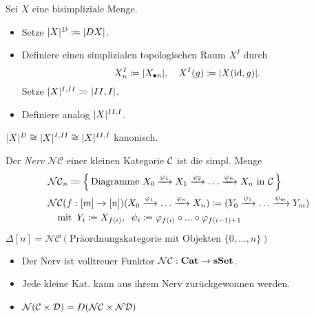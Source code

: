 \documentclass{cheat-sheet}
\newcommand{\NCat}{\mathcal{NC}} %
\newcommand{\Nerve}{\mathcal{N}} %
\begin{document}
\begin{defn}
  Sei $X$ eine bisimpliziale Menge.
  \begin{itemize}
    \item Setze $\lvert X\rvert^D \coloneqq \lvert DX\rvert$.
    \item Definiere einen simplizialen topologischen Raum $X^I$ durch
    \[ X^I_n \coloneqq \lvert X_{\bullet n}\rvert, \quad X^I(g) \coloneqq \lvert X(\operatorname{id}, g)\rvert. \]
    Setze $\lvert X\rvert^{I,II} \coloneqq \lvert II,I\rvert$.
    \item Definiere analog $\lvert X\rvert^{II,I}$.
  \end{itemize}
\end{defn}

\begin{satz}
  $\lvert X\rvert^D \cong \lvert X\rvert^{I,II} \cong \lvert X\rvert^{II,I}$ kanonisch.
\end{satz}

\begin{defn}
  Der \emph{Nerv} $\NCat$ einer kleinen Kategorie $\mathcal{C}$ ist die simpl. Menge
  \begin{align*}
    & \NCat_n \coloneqq \left\{ \, \text{Diagramme } X_0 \xrightarrow{\varphi_1} X_1 \xrightarrow{\varphi_2} \ldots \xrightarrow{\varphi_n} X_n \text{ in $\Cat$} \, \right\} \\
    & \NCat(f : [m] \to [n])(X_0 \xrightarrow{\varphi_1} \ldots \xrightarrow{\varphi_n} X_n) \coloneqq 
    ( Y_0 \xrightarrow{\psi_1} \ldots \xrightarrow{\psi_m} Y_m) \\
    & \quad \text{mit} \enspace Y_i \coloneqq X_{f(i)}, \enspace \psi_i \coloneqq \varphi_{f(i)} \circ \nldots \circ \varphi_{f(i-1)+1}
  \end{align*}
\end{defn}

\begin{bsp}
 $\Delta[n] = \NCat(\text{Präordnungskategorie mit Objekten } \{ 0, \ldots, n \})$
\end{bsp}

\begin{bem}
  \begin{itemize}
    \item Der Nerv ist volltreuer Funktor $\NCat : \CatC \to \sSet$.
    \item Jede kleine Kat. kann aus ihrem Nerv zurückgewonnen werden.
    \item $\Nerve(\Cat \times \Dat) = D(\Nerve\Cat \times \Nerve\Dat)$
  \end{itemize}
\end{bem}
\end{document}
